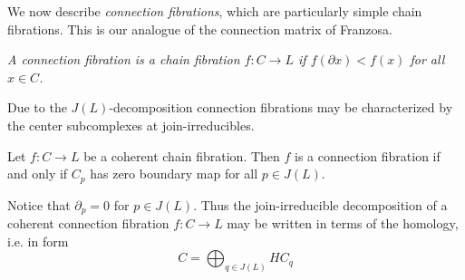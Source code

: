 We now describe {\em connection fibrations}, which are particularly simple chain fibrations. This is our analogue of the connection matrix of Franzosa.

\begin{defn}\label{def:connection}
{\em
A {\em connection fibration} is a chain fibration $f:C\to L$ if $f(\partial x) < f(x)$ for all $x\in C$.
}
\end{defn}



Due to the $J(L)$-decomposition connection fibrations may be characterized by the center subcomplexes at join-irreducibles. 


\begin{prop}
Let $f:C\to L$ be a coherent chain fibration.  Then $f$ is a connection fibration if and only if $C_p$ has zero boundary map for all $p\in J(L)$.
\end{prop}



\begin{rem}
Notice that $\partial_p = 0$ for  $p\in J(L)$.  Thus the join-irreducible decomposition of a coherent connection fibration $f:C\to L$ may be written in terms of the homology, i.e. in form $$C=\bigoplus_{q\in J(L)} HC_q$$
\end{rem}


%
%
%


